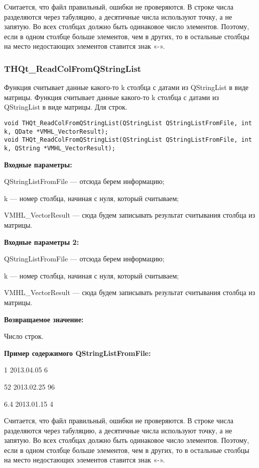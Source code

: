 \documentclass[a4paper,12pt]{article}
\begin{document}
Считается, что файл правильный, ошибки не проверяются. В строке числа разделяются через табуляцию, а десятичные числа используют точку, а не запятую. Во всех столбцах должно быть одинаковое число элементов. Поэтому, если в одном столбце больше элементов, чем в других, то в остальные столбцы на место недостающих элементов ставится знак «-».


\subsubsection{THQt\_ReadColFromQStringList}\label{THQt_ReadColFromQStringList}

Функция считывает данные какого-то k столбца с датами из QStringList в виде матрицы. Функция считывает данные какого-то k столбца с датами из QStringList в виде матрицы. Для строк.


\begin{lstlisting}[label=code_syntax_THQt_ReadColFromQStringList,caption=Синтаксис]
void THQt_ReadColFromQStringList(QStringList QStringListFromFile, int k, QDate *VMHL_VectorResult);
void THQt_ReadColFromQStringList(QStringList QStringListFromFile, int k, QString *VMHL_VectorResult);
\end{lstlisting}

\textbf{Входные параметры:}

QStringListFromFile --- отсюда берем информацию;
 
    k --- номер столбца, начиная с нуля, который считываем;
 
    VMHL\_VectorResult --- сюда будем записывать результат считывания столбца из матрицы.
	
\textbf{Входные параметры 2:}
	
	 QStringListFromFile --- отсюда берем информацию;
 
    k --- номер столбца, начиная с нуля, который считываем;
 
    VMHL\_VectorResult --- сюда будем записывать результат считывания столбца из матрицы.

\textbf{Возвращаемое значение:}

Число строк.

\textbf{Пример содержимого QStringListFromFile:}

1	2013.04.05	6

52	2013.02.25	96

6.4	2013.01.15	4

Считается, что файл правильный, ошибки не проверяются. В строке числа разделяются через табуляцию, а десятичные числа используют точку, а не запятую. Во всех столбцах должно быть одинаковое число элементов. Поэтому, если в одном столбце больше элементов, чем в других, то в остальные столбцы на место недостающих элементов ставится знак «-».
\end{document}
